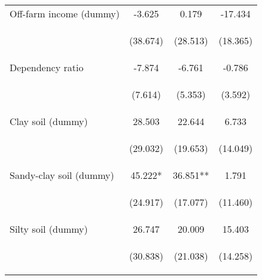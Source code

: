 \begin{center}
\begin{tabular}{lccc}
Off-farm income (dummy) & -3.625 & 0.179 & -17.434 \\
\vspace{4pt} & \begin{footnotesize}(38.674)\end{footnotesize} & \begin{footnotesize}(28.513)\end{footnotesize} & \begin{footnotesize}(18.365)\end{footnotesize} \\
Dependency ratio & -7.874 & -6.761 & -0.786 \\
\vspace{4pt} & \begin{footnotesize}(7.614)\end{footnotesize} & \begin{footnotesize}(5.353)\end{footnotesize} & \begin{footnotesize}(3.592)\end{footnotesize} \\
Clay soil (dummy) & 28.503 & 22.644 & 6.733 \\
\vspace{4pt} & \begin{footnotesize}(29.032)\end{footnotesize} & \begin{footnotesize}(19.653)\end{footnotesize} & \begin{footnotesize}(14.049)\end{footnotesize} \\
Sandy-clay soil (dummy) & 45.222* & 36.851** & 1.791 \\
\vspace{4pt} & \begin{footnotesize}(24.917)\end{footnotesize} & \begin{footnotesize}(17.077)\end{footnotesize} & \begin{footnotesize}(11.460)\end{footnotesize} \\
Silty soil (dummy) & 26.747 & 20.009 & 15.403 \\
\vspace{4pt} & \begin{footnotesize}(30.838)\end{footnotesize} & \begin{footnotesize}(21.038)\end{footnotesize} & \begin{footnotesize}(14.258)\end{footnotesize} \\

\end{tabular}
\end{center}
